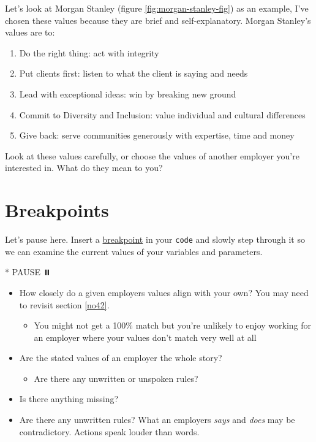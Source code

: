 \documentclass[
]{book}
\newenvironment{Shaded}{\begin{snugshade}}{\end{snugshade}}
\newcommand{\NormalTok}[1]{#1}
\newcommand{\SpecialStringTok}[1]{\textcolor[rgb]{0.31,0.60,0.02}{#1}}
\providecommand{\tightlist}{%
  \setlength{\itemsep}{0pt}\setlength{\parskip}{0pt}}
\begin{document}
Let's look at Morgan Stanley (figure \ref{fig:morgan-stanley-fig}) as an example, I've chosen these values because they are brief and self-explanatory. Morgan Stanley's values are to:

\begin{enumerate}
\def\labelenumi{\arabic{enumi}.}
\tightlist
\item
  Do the right thing: act with integrity
\item
  Put clients first: listen to what the client is saying and needs
\item
  Lead with exceptional ideas: win by breaking new ground
\item
  Commit to Diversity and Inclusion: value individual and cultural differences
\item
  Give back: serve communities generously with expertise, time and money
\end{enumerate}

Look at these values carefully, or choose the values of another employer you're interested in. What do they mean to you?

\hypertarget{bp9}{%
\section{Breakpoints}\label{bp9}}

Let's pause here. Insert a \href{https://en.wikipedia.org/wiki/Breakpoint}{breakpoint} in your \texttt{code} and slowly step through it so we can examine the current values of your variables and parameters.

\begin{Shaded}
\begin{Highlighting}[]
\SpecialStringTok{* }\NormalTok{PAUSE ⏸️}
\end{Highlighting}
\end{Shaded}

\begin{itemize}
\tightlist
\item
  How closely do a given employers values align with your own? You may need to revisit section \ref{no42}.

  \begin{itemize}
  \tightlist
  \item
    You might not get a 100\% match but you're unlikely to enjoy working for an employer where your values don't match very well at all
  \end{itemize}
\item
  Are the stated values of an employer the whole story?

  \begin{itemize}
  \tightlist
  \item
    Are there any unwritten or unspoken rules?
  \end{itemize}
\item
  Is there anything missing?
\item
  Are there any unwritten rules? What an employers \emph{says} and \emph{does} may be contradictory. Actions speak louder than words.
\end{itemize}
\end{document}
